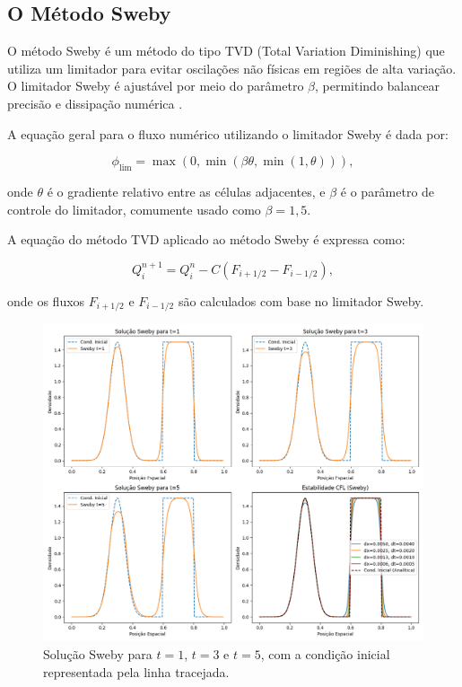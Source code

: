 \subsection{O Método Sweby}

O método Sweby é um método do tipo TVD (Total Variation Diminishing) que utiliza um limitador para evitar oscilações não físicas em regiões de alta variação. O limitador Sweby é ajustável por meio do parâmetro \(\beta\), permitindo balancear precisão e dissipação numérica \cite{sweby1984high}.

A equação geral para o fluxo numérico utilizando o limitador Sweby é dada por:

\begin{equation}
    \phi_{\text{lim}} = \max\left(0, \min\left(\beta \theta, \min\left(1, \theta\right)\right)\right),
\end{equation}

onde \(\theta\) é o gradiente relativo entre as células adjacentes, e \(\beta\) é o parâmetro de controle do limitador, comumente usado como \(\beta = 1,5\).

A equação do método TVD aplicado ao método Sweby é expressa como:

\begin{equation}
    Q_i^{n+1} = Q_i^n - C (F_{i+1/2} - F_{i-1/2}),
\end{equation}

onde os fluxos \(F_{i+1/2}\) e \(F_{i-1/2}\) são calculados com base no limitador Sweby.

\begin{figure}[H]
    \centering
    \includegraphics[width=\textwidth]{code/images/Sweby.png}
    \caption{Solução Sweby para \(t=1\), \(t=3\) e \(t=5\), com a condição inicial representada pela linha tracejada.}
    \label{fig:sweby}
\end{figure}

